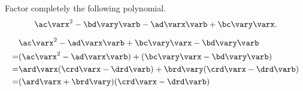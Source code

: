 






\pgfmathtruncatemacro{\ac}{\ard*\crd}
\pgfmathtruncatemacro{\ad}{\ard*\drd}
\pgfmathtruncatemacro{\bc}{\brd*\crd}
\pgfmathtruncatemacro{\bd}{\brd*\drd}



\edef\varxy{\varx}

\edef\varab{\vara}

\edef\varpq{\varb}

\edef\varmn{\vary}








Factor completely the following polynomial.
\[\ac\varx^2  -{\bd}\vary\varb -\ad\varx\varb + {\bc}\vary\varx .\]

\begin{solution}
\[\begin{split}
&\ac\varx^2 -{\ad}\varx\varb +{\bc}\vary\varx -{\bd}\vary\varb\\
=&(\ac\varx^2 -{\ad}\varx\varb) + (\bc\vary\varx -{\bd}\vary\varb)\\
=&\ard\varx(\crd\varx - {\drd}\varb)+ {\brd}\vary(\crd\varx - {\drd}\varb)\\
=&(\ard\varx + {\brd}\vary)(\crd\varx -{\drd}\varb)
\end{split}
\]
\end{solution}
